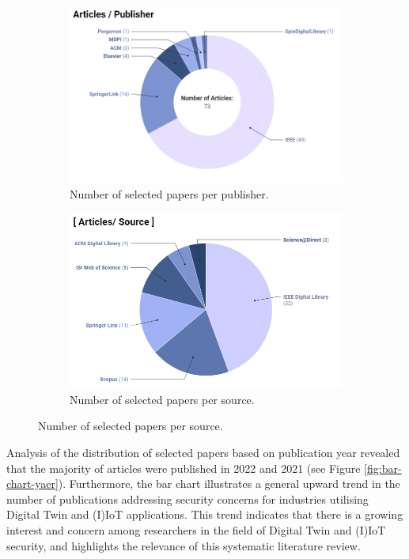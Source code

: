 \begin{figure}[H]    
    \caption{An Analysis of Paper Distribution Based on Source and Publisher.}
    \begin{subfigure}[b]{0.45\textwidth}
    \caption{Number of selected papers per publisher.}
        \includegraphics[width=\textwidth]{images/articles_per_publisher_2.png}
    \end{subfigure}
    \begin{subfigure}[b]{0.45\textwidth}
    \caption{Number of selected papers per source.}
        \includegraphics[width=\textwidth]{images/artpersrc_final.png}
    \end{subfigure}
    \label{fig:archive-itemtype}
\end{figure}
 
Analysis of the distribution of selected papers based on publication year revealed that the majority of articles were published in 2022 and 2021 (see Figure \ref{fig:bar-chart-yaer}). Furthermore, the bar chart illustrates a general upward trend in the number of publications addressing security concerns for industries utilising Digital Twin and (I)IoT applications. This trend indicates that there is a growing interest and concern among researchers in the field of Digital Twin and (I)IoT security, and highlights the relevance of this systematic literature review.

